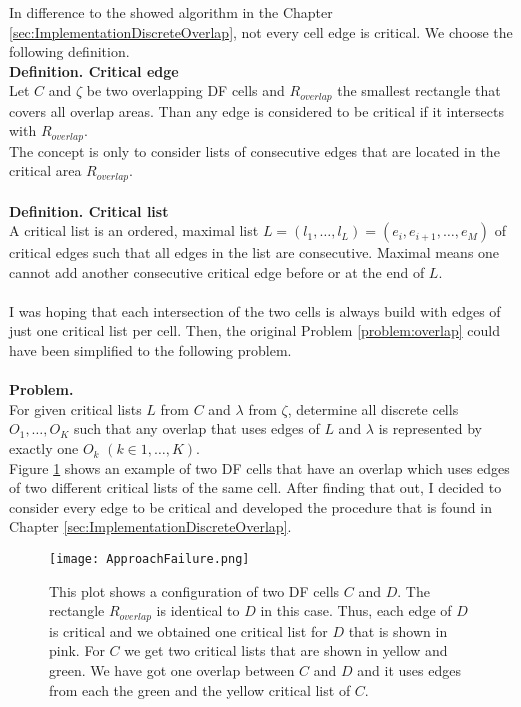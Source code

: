 \documentclass[a4paper,12pt,leqno]{article}
\theoremstyle{plain}
\theoremstyle{remark}
\begin{document}
In difference to the showed algorithm in the Chapter \ref{sec:ImplementationDiscreteOverlap}, not every cell edge is critical. We choose the following definition. 
\text{} \\  
\textbf{Definition. Critical edge} \\
Let $C$ and $\zeta$ be two overlapping DF cells and $R_{overlap}$ the smallest rectangle that covers all overlap areas. Than any edge is considered to be critical if it intersects with $R_{overlap}$. 
\text{} \\  
The concept is only to consider lists of consecutive edges that are located in the critical area $R_{overlap}$. \\
\text{} \\  
\textbf{Definition. Critical list} \\
A critical list is an ordered, maximal list $L = (l_1, \ldots, l_L) = (e_i, e_{i+1}, \ldots, e_M)$ of critical edges such that all edges in the list are consecutive. Maximal means one cannot add another consecutive critical edge before or at the end of $L$. \\
\text{} \\  
I was hoping that each intersection of the two cells is always build with edges of just one critical list per cell.
Then, the original Problem \ref{problem:overlap} could have been simplified to the following problem.\\
\text{} \\  
\textbf{Problem.} \\
For given critical lists $L$ from $C$ and $\lambda$ from $\zeta$, determine all discrete cells $O_1, \ldots, O_K$ such that any overlap that uses edges of $L$ and $\lambda$ is represented by exactly one $O_k$ $(k \in 1, \ldots, K)$. 
\text{} \\  
Figure \ref{fig:failedLists} shows an example of two DF cells that have an overlap which uses edges of two different critical lists of the same cell. After finding that out, I decided to consider every edge to be critical and developed the procedure that is found in Chapter \ref{sec:ImplementationDiscreteOverlap}. 
\begin{figure}[h!]
	\centering
	\texttt{[image: ApproachFailure.png]}{}
	\caption{This plot shows a configuration of two DF cells $C$ and $D$. The rectangle $R_{overlap}$ is identical to $D$ in this case. Thus, each edge of $D$ is critical and we obtained one critical list for $D$ that is shown in pink. For $C$ we get two critical lists that are shown in yellow and green. We have got one overlap between $C$ and $D$ and it uses edges from each the green and the yellow critical list of $C$.}
	\label{fig:failedLists}
\end{figure}
\end{document}

